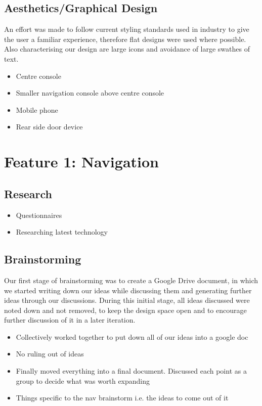 \documentclass{article}
\begin{document}
\subsection{Aesthetics/Graphical Design} \label{ssec:aesthetics}
An effort was made to follow current styling standards used in industry to give the user a familiar experience, therefore flat designs were used where possible. Also characterising our design are large icons and avoidance of large swathes of text.  
    
    \begin{itemize}
		\item Centre console
        \item Smaller navigation console above centre console
        \item Mobile phone
        \item Rear side door device
	\end{itemize}
    
\section{Feature 1: Navigation} \label{sec:nav}

\subsection{Research} \label{ssec:nav-research}
  \begin{itemize}
    \item Questionnaires
    \item Researching latest technology
  \end{itemize}
  
\subsection{Brainstorming} \label{ssec:nav-brainstorming}
Our first stage of brainstorming was to create a Google Drive document, in which we started writing down our ideas while discussing them and generating further ideas through our discussions. During this initial stage, all ideas discussed were noted down and not removed, to keep the design space open and to encourage further discussion of it in a later iteration.
	\begin{itemize}
		\item Collectively worked together to put down all of our ideas into a google doc
		\item No ruling out of ideas
		\item Finally moved everything into a final document. Discussed each point as a group to decide what was worth expanding
        \item Things specific to the nav brainstorm i.e. the ideas to come out of it
	\end{itemize}
    
\end{document}
